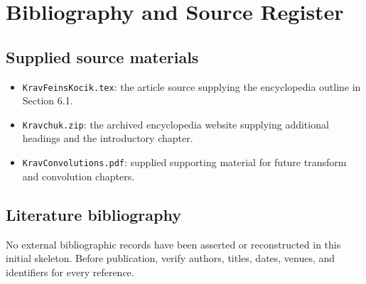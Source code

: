 \documentclass[11pt,oneside]{amsbook}
\theoremstyle{definition}
\theoremstyle{remark}
\begin{document}
\chapter*{Bibliography and Source Register}
\section*{Supplied source materials}
\begin{itemize}
\item \texttt{KravFeinsKocik.tex}: the article source supplying the encyclopedia outline in Section 6.1.
\item \texttt{Kravchuk.zip}: the archived encyclopedia website supplying additional headings and the introductory chapter.
\item \texttt{KravConvolutions.pdf}: supplied supporting material for future transform and convolution chapters.
\end{itemize}
\section*{Literature bibliography}
No external bibliographic records have been asserted or reconstructed in this initial skeleton. Before publication, verify authors, titles, dates, venues, and identifiers for every reference.
\end{document}
